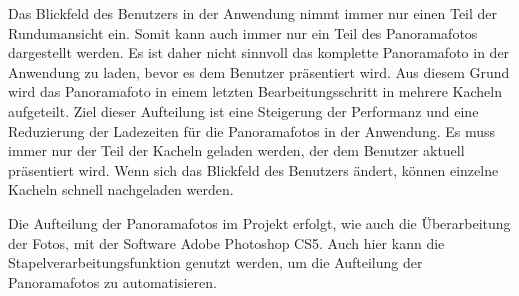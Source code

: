 Das Blickfeld des Benutzers in der Anwendung nimmt immer nur einen Teil der
Rundumansicht ein. Somit kann auch immer nur ein Teil des Panoramafotos
dargestellt werden. Es ist daher nicht sinnvoll das komplette Panoramafoto in
der Anwendung zu laden, bevor es dem Benutzer präsentiert wird.
Aus diesem Grund wird das Panoramafoto in einem letzten Bearbeitungsschritt in
mehrere Kacheln aufgeteilt. Ziel dieser Aufteilung ist eine Steigerung der
Performanz und eine Reduzierung der Ladezeiten für die Panoramafotos in der
Anwendung. Es muss immer nur der Teil der Kacheln geladen werden, der dem
Benutzer aktuell präsentiert wird. Wenn sich das Blickfeld des Benutzers ändert,
können einzelne Kacheln schnell nachgeladen werden.

Die Aufteilung der Panoramafotos im Projekt erfolgt, wie auch die Überarbeitung
der Fotos, mit der Software Adobe Photoshop CS5. Auch hier kann die
Stapelverarbeitungsfunktion genutzt werden, um die Aufteilung der Panoramafotos
zu automatisieren.

